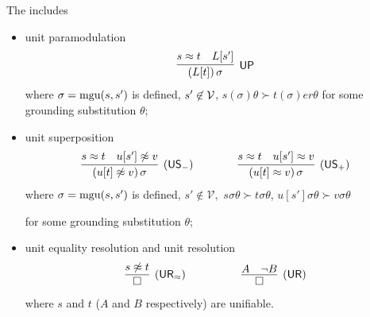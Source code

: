 



\begin{definition}\label{def:unit-superpositin-calculus}
	The  includes
	\begin{itemize}
		\item unit paramodulation
		\begin{gather*}
		\infer
		[\mathsf{UP}]
		{(L[t])\,\sigma}
		{s\mEQ t&L[s']}
		\end{gather*}
		where \( \sigma=\operatorname{mgu}(s,s') \) is defined,
		\( s'\not\in\mathcal{V} \),
		\( s(\sigma)\theta\succ t(\sigma)er\theta \)
		for some grounding substitution \( \theta \);

		\item unit superposition
		\begin{gather*}
		\infer
		[\mathsf{(US_-)}]
		{(u[t]\mNE v)\,\sigma}
		{s\mEQ t&u[s']\mNE v}
		\qquad\qquad
		\infer
		[\mathsf{(US_+)}]
		{(u[t]\mEQ v)\,\sigma}
		{s\mEQ t&u[s']\mEQ v}
		\end{gather*}
		where \( \sigma=\operatorname{mgu}(s,s') \) is defined,
		\( s'\not\in\mathcal{V}, \)
		\( s\sigma\theta\succ t\sigma\theta \),
		\( u[s']\sigma\theta\succ v\sigma\theta \)

		for some grounding substitution \( \theta \);
		\item unit equality resolution and unit resolution
		\begin{gather*}
		\infer
		[\mathsf{(UR_\mEQ)}]
		{\emptyclause}
		{s\mNE t}
		\quad\quad\quad\qquad
		\infer
		[\mathsf{(UR)}]
		{\emptyclause}
		{A&\lnot B}
		\end{gather*}
		where \( s \) and \( t \) (\( A \) and \( B \) respectively) are unifiable.
	\end{itemize}
\end{definition}